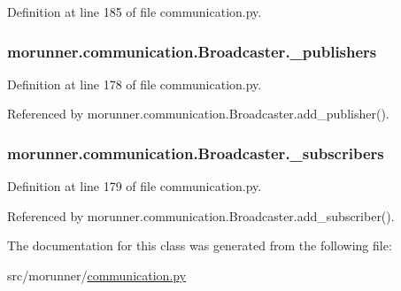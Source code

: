 Definition at line 185 of file communication.\+py.

\hypertarget{classmorunner_1_1communication_1_1Broadcaster_a7d493d4d4af6ae6ace1e22f38e32c6c0}{}
\subsubsection[{\+\_\+publishers}]{\setlength{\rightskip}{0pt plus 5cm}morunner.\+communication.\+Broadcaster.\+\_\+publishers\hspace{0.3cm}{\ttfamily [private]}}\label{classmorunner_1_1communication_1_1Broadcaster_a7d493d4d4af6ae6ace1e22f38e32c6c0}


Definition at line 178 of file communication.\+py.



Referenced by morunner.\+communication.\+Broadcaster.\+add\+\_\+publisher().

\hypertarget{classmorunner_1_1communication_1_1Broadcaster_acc9ff1f0cf6bb65e494d8cacf497886f}{}
\subsubsection[{\+\_\+subscribers}]{\setlength{\rightskip}{0pt plus 5cm}morunner.\+communication.\+Broadcaster.\+\_\+subscribers\hspace{0.3cm}{\ttfamily [private]}}\label{classmorunner_1_1communication_1_1Broadcaster_acc9ff1f0cf6bb65e494d8cacf497886f}


Definition at line 179 of file communication.\+py.



Referenced by morunner.\+communication.\+Broadcaster.\+add\+\_\+subscriber().



The documentation for this class was generated from the following file\+:\begin{DoxyCompactItemize}
\item 
src/morunner/\hyperlink{communication_8py}{communication.\+py}\end{DoxyCompactItemize}
